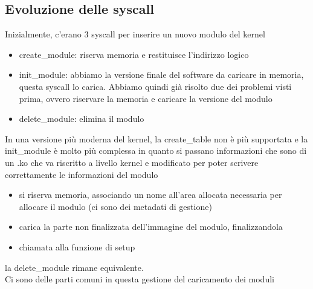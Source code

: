 \documentclass[12pt, oneside]{extbook}
\begin{document}
\subsection{Evoluzione delle syscall}
Inizialmente, c'erano 3 syscall per inserire un nuovo modulo del kernel
\begin{itemize}
\item \textsf{create\_module}: riserva memoria e restituisce l'indirizzo logico
\item \textsf{init\_module}: abbiamo la versione finale del software da caricare in memoria, questa syscall lo carica. Abbiamo quindi già risolto due dei problemi visti prima, ovvero riservare la memoria e caricare la versione del modulo
\item \textsf{delete\_module}: elimina il modulo
\end{itemize}
In una versione più moderna del kernel, la \textsf{create\_table} non è più supportata e la \textsf{init\_module} è molto più complessa in quanto si passano informazioni che sono di un .ko che va riscritto a livello kernel e modificato per poter scrivere correttamente le informazioni del modulo
\begin{itemize}
\item si riserva memoria, associando un nome all'area allocata necessaria per allocare il modulo (ci sono dei metadati di gestione)
\item carica la parte non finalizzata dell'immagine del modulo, finalizzandola
\item chiamata alla funzione di setup
\end{itemize}
la \textsf{delete\_module} rimane equivalente.\\Ci sono delle parti comuni in questa gestione del caricamento dei moduli
\end{document}
